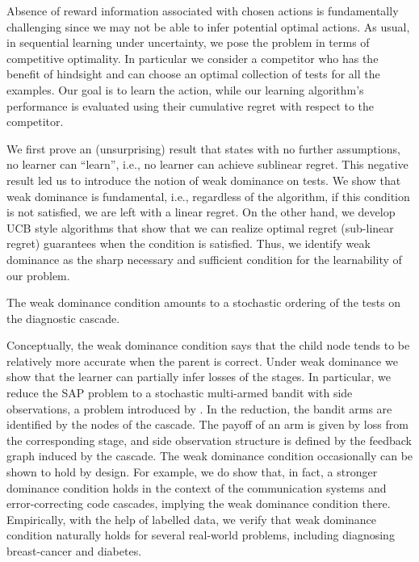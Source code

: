 Absence of reward information associated with chosen actions is fundamentally challenging since we may not be able to infer potential optimal actions. As usual, in sequential learning under uncertainty, we pose the problem in terms of competitive optimality. In particular we consider a competitor who has the benefit of hindsight and can choose an optimal collection of tests for all the examples. Our goal is to learn the action, while our learning algorithm's performance is evaluated using their  cumulative regret with respect to the competitor.

We first prove an (unsurprising) result that states 
with no further assumptions, no learner can ``learn'', i.e., no learner can achieve sublinear regret.
This negative result led us to introduce the notion of weak dominance on tests. 
We show that weak dominance is fundamental, i.e., regardless of the algorithm, if this condition is not satisfied, we are left with a linear regret. On the other hand, we develop UCB style algorithms that show that we can realize optimal regret (sub-linear regret) guarantees when the condition is satisfied. 
Thus, we identify weak dominance as the sharp necessary and sufficient condition for the learnability of
our \ses problem.

The weak dominance condition amounts to a stochastic ordering of the tests on the diagnostic cascade. 

Conceptually, the weak dominance condition says that the child node tends to be relatively more accurate when the parent is correct.
Under weak dominance we show that the learner can partially infer losses of the stages. 
In particular, we reduce the SAP problem to a stochastic multi-armed bandit with side observations, 
a problem introduced by \citet{MaSh11}.
In the reduction, the bandit arms are identified by the nodes of the cascade. 
The payoff of an arm is given by loss from the corresponding stage, and side observation structure is defined by the feedback graph induced by the cascade. 
The weak dominance condition occasionally can be shown to hold by design. For example, we do show that,
in fact, a stronger dominance condition holds in the context of the communication systems 
and error-correcting code cascades, implying the weak dominance condition there.
Empirically, with the help of labelled data, 
we verify that weak dominance condition naturally holds for several real-world problems,
including diagnosing breast-cancer and diabetes.

